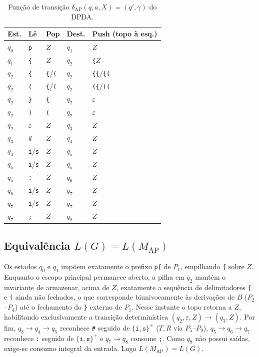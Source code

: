 \begin{table}[t]
\centering
\caption{Função de transição $\delta_{\text{AP}}(q, a, X) = (q', \gamma)$ do DPDA.}
\label{tab:ap_delta}
\scriptsize
\setlength{\tabcolsep}{4pt}
\begin{tabular}{@{}lllll@{}}
\toprule
Est. & Lê & Pop & Dest. & Push (topo à esq.) \\
\midrule
$q_0$ & \texttt{p} & $Z$ & $q_1$ & $Z$ \\
$q_1$ & \texttt{\{} & $Z$ & $q_2$ & \texttt{\{}$Z$ \\
$q_2$ & \texttt{\{} & \texttt{\{}/\texttt{(} & $q_2$ & \texttt{\{\{}/\texttt{\{(} \\
$q_2$ & \texttt{(} & \texttt{\{}/\texttt{(} & $q_2$ & \texttt{(\{}/\texttt{((} \\
$q_2$ & \texttt{\}} & \texttt{\{} & $q_2$ & $\varepsilon$ \\
$q_2$ & \texttt{)} & \texttt{(} & $q_2$ & $\varepsilon$ \\
$q_2$ & $\varepsilon$ & $Z$ & $q_3$ & $Z$ \\
$q_3$ & \texttt{\#} & $Z$ & $q_4$ & $Z$ \\
$q_4$ & \texttt{i}/\texttt{s} & $Z$ & $q_5$ & $Z$ \\
$q_5$ & \texttt{i}/\texttt{s} & $Z$ & $q_5$ & $Z$ \\
$q_5$ & \texttt{:} & $Z$ & $q_6$ & $Z$ \\
$q_6$ & \texttt{i}/\texttt{s} & $Z$ & $q_7$ & $Z$ \\
$q_7$ & \texttt{i}/\texttt{s} & $Z$ & $q_7$ & $Z$ \\
$q_7$ & \texttt{;} & $Z$ & $q_8$ & $Z$ \\
\bottomrule
\end{tabular}
\end{table}

\subsection{Equivalência $L(G) = L(M_{\text{AP}})$}

Os estados $q_0$ e $q_1$ impõem exatamente o prefixo \texttt{p\{} de $P_1$, empilhando \texttt{\{} sobre $Z$. Enquanto o escopo principal permanece aberto, a pilha em $q_2$ mantém o invariante de armazenar, acima de $Z$, exatamente a sequência de delimitadores \texttt{\{} e \texttt{(} ainda não fechados, o que corresponde biunivocamente às derivações de $B$ ($P_2$--$P_4$) até o fechamento do \texttt{\}} externo de $P_1$. Nesse instante o topo retorna a $Z$, habilitando exclusivamente a transição determinística $(q_2, \varepsilon, Z) \to (q_3, Z)$. Por fim, $q_3 \to q_4 \to q_5$ reconhece \texttt{\#} seguido de $\{\texttt{i},\texttt{s}\}^+$ ($T, R$ via $P_5$--$P_9$), $q_5 \to q_6 \to q_7$ reconhece \texttt{:} seguido de $\{\texttt{i},\texttt{s}\}^+$ e $q_7 \to q_8$ consome \texttt{;}. Como $q_8$ não possui saídas, exige-se consumo integral da entrada. Logo $L(M_{\text{AP}}) = L(G)$.
